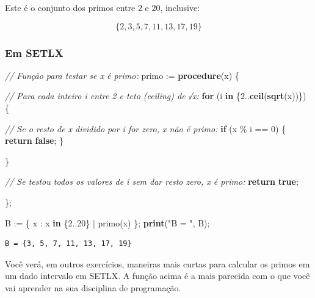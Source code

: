 \documentclass[
  letterpaper,
  DIV=11,
  numbers=noendperiod]{scrreprt}
\newenvironment{Shaded}{\begin{snugshade}}{\end{snugshade}}
\newcommand{\CommentTok}[1]{\textcolor[rgb]{0.56,0.35,0.01}{\textit{#1}}}
\newcommand{\DecValTok}[1]{\textcolor[rgb]{0.00,0.00,0.81}{#1}}
\newcommand{\KeywordTok}[1]{\textcolor[rgb]{0.13,0.29,0.53}{\textbf{#1}}}
\newcommand{\NormalTok}[1]{#1}
\newcommand{\StringTok}[1]{\textcolor[rgb]{0.31,0.60,0.02}{#1}}
\begin{document}
\begin{tcolorbox}[enhanced jigsaw, breakable, toptitle=1mm, opacitybacktitle=0.6, colback=white, toprule=.15mm, left=2mm, rightrule=.15mm, leftrule=.75mm, title={Resposta (b)}, coltitle=black, arc=.35mm, bottomtitle=1mm, opacityback=0, bottomrule=.15mm, colframe=quarto-callout-important-color-frame, titlerule=0mm, colbacktitle=quarto-callout-important-color!10!white]

Este é o conjunto dos primos entre $2$ e $20$, inclusive:

\[
\{ 2, 3, 5, 7, 11, 13, 17, 19 \}
\]

\subsubsection*{Em SETLX}\label{em-setlx-2}

\begin{Shaded}
\begin{Highlighting}[]
\CommentTok{// Função para testar se x é primo:}
\NormalTok{primo := }\KeywordTok{procedure}\NormalTok{(x) \{}
  
  \CommentTok{// Para cada inteiro i entre 2 e teto (ceiling) de √x:}
  \KeywordTok{for}\NormalTok{ (i }\KeywordTok{in}\NormalTok{ \{}\DecValTok{2}\NormalTok{..}\KeywordTok{ceil}\NormalTok{(}\KeywordTok{sqrt}\NormalTok{(x))\}) \{}
    
    \CommentTok{// Se o resto de x dividido por i for zero, x não é primo:}
    \KeywordTok{if}\NormalTok{ (x \% i == }\DecValTok{0}\NormalTok{) \{}
      \KeywordTok{return} \KeywordTok{false}\NormalTok{;}
\NormalTok{    \}}
    
\NormalTok{  \}}
  
  \CommentTok{// Se testou todos os valores de i sem dar resto zero, x é primo:}
  \KeywordTok{return} \KeywordTok{true}\NormalTok{;}
  
\NormalTok{\};}

\NormalTok{B := \{ x : x }\KeywordTok{in}\NormalTok{ \{}\DecValTok{2}\NormalTok{..}\DecValTok{20}\NormalTok{\} | primo(x) \};}
\KeywordTok{print}\NormalTok{(}\StringTok{"B = "}\NormalTok{, B);}
\end{Highlighting}
\end{Shaded}

\begin{verbatim}
B = {3, 5, 7, 11, 13, 17, 19}
\end{verbatim}

Você verá, em outros exercícios, maneiras mais curtas para calcular os
primos em um dado intervalo em SETLX. A função acima é a mais parecida
com o que você vai aprender na sua disciplina de programação.

\end{tcolorbox}
\end{document}
